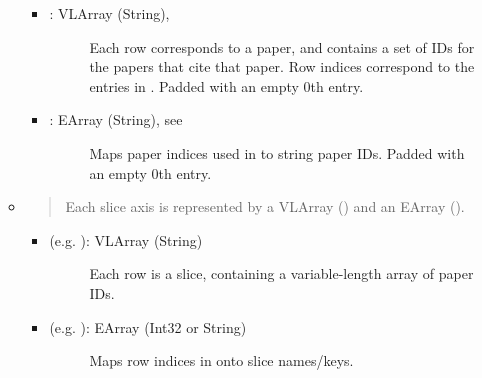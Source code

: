 \documentclass[letterpaper,10pt,english]{sphinxmanual}
\begin{document}
\begin{fulllineitems}
\begin{itemize}
\begin{itemize}
\begin{itemize}
\begin{description}
\end{description}

\item {} \begin{description}
\item[{: VLArray (String), {\hyperref[tethne.persistence.hdf5.util:tethne.persistence.hdf5.util.vlarray_dict]{}}}] \leavevmode
Each row corresponds to a paper, and contains a set of IDs for the papers
that cite that paper. Row indices correspond to the entries in
. Padded with an empty 0th entry.

\end{description}

\item {} \begin{description}
\item[{: EArray (String), see {\hyperref[tethne.persistence.hdf5.util:tethne.persistence.hdf5.util.vlarray_dict]{}}}] \leavevmode
Maps paper indices used in  to string paper IDs.
Padded with an empty 0th entry.

\end{description}

\end{itemize}

\item {} 
\begin{quote}

Each slice axis is represented by a VLArray () and an EArray
().
\end{quote}
\begin{itemize}
\item {} \begin{description}
\item[{ (e.g. ): VLArray (String)}] \leavevmode
Each row is a slice, containing a variable-length array of paper IDs.

\end{description}

\item {} \begin{description}
\item[{ (e.g. ): EArray (Int32 or String)}] \leavevmode
Maps row indices in  onto slice names/keys.


\end{description}
\end{itemize}
\end{itemize}
\end{itemize}
\end{fulllineitems}
\end{document}
